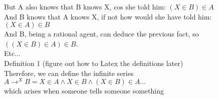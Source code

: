 \documentclass[12pt,a4paper]{article}
\begin{document}
But A also knows that B knows X, cos she told him: $(X \in B) \in A$ \\

And B knows that A knows X, if not how would she have told him: $(X \in A) \in B$ \\

And B, being a rational agent, can deduce the previous fact, so $((X \in B) \in A) \in B$. \\

Etc... \\

Definition 1 (figure out how to Latex the definitions later) \\

Therefore, we can define the infinite series $A \rightarrow^X B = X \in A \wedge X \in B \wedge (X \in B) \in A ...$ \\

which arises when someone tells someone something \\


	
\end{document}
